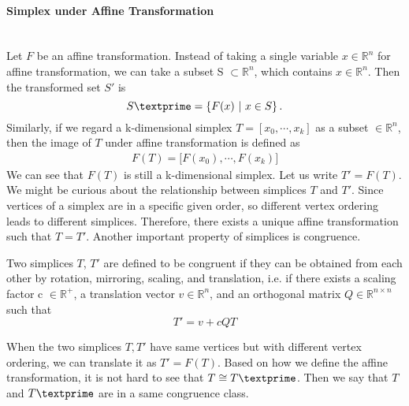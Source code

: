     \paragraph{Simplex under Affine Transformation}\mbox{}\\
    Let $F$ be an affine transformation. 
    Instead of taking a single variable $x\in\mathbb{R}^n$ for affine transformation, we can take a subset S $\subset\mathbb{R}^n$, which contains $x\in\mathbb{R}^n$. Then the transformed set $S'$ is
    \begin{equation*}
    S\textprime= \left\{{F}(x) ~|~ x\in S \right\}.
    \end{equation*}
    Similarly, if we regard a k-dimensional simplex ${T} = [{x_0, \cdots, x_k}]$ as a subset $\in\mathbb{R}^n$, then the image of ${T}$ under affine transformation is defined as
    \begin{equation*}
    \begin{split}
    {F}({T}) = \big[{F}(x_0), \cdots , {F}(x_k)\big]
    \end{split}
    \end{equation*}
    We can see that $F(T)$ is still a k-dimensional simplex. Let us write $T' = F(T)$. We might be curious about the relationship between simplices $T$ and $T'$. Since vertices of a simplex are in a specific given order, so different vertex ordering leads to different simplices. Therefore, there exists a unique affine transformation such that $T = T'$. Another important property of simplices is congruence.

    \begin{definition*}
    Two simplices $T$, $T'$ are defined to be congruent if they can be obtained from each other by rotation, mirroring, scaling, and translation, i.e. if there exists a scaling factor c $\in\mathbb{R}^{+}$, a translation vector $v\in\mathbb{R}^n$, and an orthogonal matrix $Q\in\mathbb{R}^{n\times n}$ such that
    \begin{equation*}
    T' = v + cQT
    \end{equation*}
    \end{definition*}
    \noindent
    When the two simplices $T, T'$ have same vertices but with different vertex ordering, we can translate it as $T' = F(T)$. Based on how we define the affine transformation, it is not hard to see that ${T} \cong {T}\textprime$. Then we say that ${T}$ and ${T}\textprime$ are in a same congruence class.